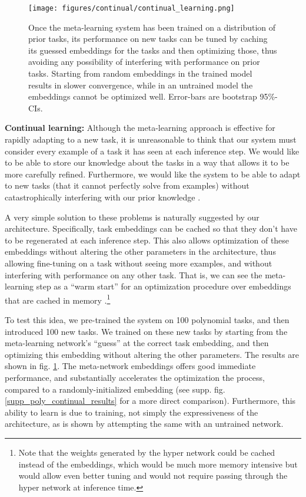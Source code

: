\documentclass{article}
\begin{document}
\begin{figure}
\centering
\texttt{[image: figures/continual/continual\_learning.png]}
\caption{Once the meta-learning system has been trained on a distribution of prior tasks, its performance on new tasks can be tuned by caching its guessed embeddings for the tasks and then optimizing those, thus avoiding any possibility of interfering with performance on prior tasks. Starting from random embeddings in the trained model results in slower convergence, while in an untrained model the embeddings cannot be optimized well. Error-bars are bootstrap 95\%-CIs.}
\label{poly_continual_results}
\end{figure}
\textbf{Continual learning:} Although the meta-learning approach is effective for rapidly adapting to a new task, it is unreasonable to think that our system must consider every example of a task it has seen at each inference step. We would like to be able to store our knowledge about the tasks in a way that allows it to be more carefully refined. Furthermore, we would like the system to be able to adapt to new tasks (that it cannot perfectly solve from examples) without catastrophically interfering with our prior knowledge \citep{McCloskey1989}. \par
A very simple solution to these problems is naturally suggested by our architecture. Specifically, task embeddings can be cached so that they don't have to be regenerated at each inference step. This also allows optimization of these embeddings without altering the other parameters in the architecture, thus allowing fine-tuning on a task without seeing more examples, and without interfering with performance on any other task. That is, we can see the meta-learning step as a ``warm start'' for an optimization procedure over embeddings that are cached in memory \citep[c.f.][]{Kumaran2016}.\footnote{Note that the weights generated by the hyper network could be cached instead of the embeddings, which would be much more memory intensive but would allow even better tuning and would not require passing through the hyper network at inference time.} \par 
To test this idea, we pre-trained the system on 100 polynomial tasks, and then introduced 100 new tasks. We trained on these new tasks by starting from the meta-learning network's ``guess'' at the correct task embedding, and then optimizing this embedding without altering the other parameters. The results are shown in fig. \ref{poly_continual_results}. The meta-network embeddings offers good immediate performance, and substantially accelerates the optimization the process, compared to a randomly-initialized embedding (see supp. fig. \ref{supp_poly_continual_results} for a more direct comparison). Furthermore, this ability to learn is due to training, not simply the expressiveness of the architecture, as is shown by attempting the same with an untrained network. \par 
\end{document}

